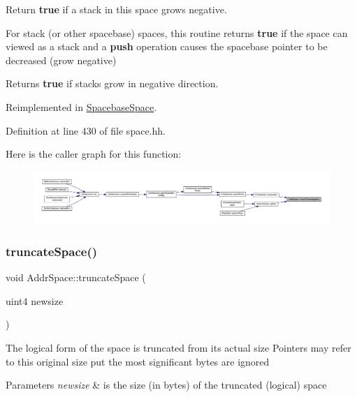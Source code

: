 Return {\bfseries{true}} if a stack in this space grows negative. 

For stack (or other spacebase) spaces, this routine returns {\bfseries{true}} if the space can viewed as a stack and a {\bfseries{push}} operation causes the spacebase pointer to be decreased (grow negative) \begin{DoxyReturn}{Returns}
{\bfseries{true}} if stacks grow in negative direction. 
\end{DoxyReturn}


Reimplemented in \mbox{\hyperlink{class_spacebase_space_abade76813d5936d68f715cfde95a764c}{Spacebase\+Space}}.



Definition at line 430 of file space.\+hh.

Here is the caller graph for this function\+:
\nopagebreak
\begin{figure}[H]
\begin{center}
\leavevmode
\includegraphics[width=350pt]{class_addr_space_a9468b2d0bc4cdaa762e213fb395ac434_icgraph}
\end{center}
\end{figure}
\mbox{\label{class_addr_space_a84ecacea771a34c4349d1f31272316c7}} 
\subsubsection{\texorpdfstring{truncateSpace()}{truncateSpace()}}
{\footnotesize\ttfamily void Addr\+Space\+::truncate\+Space (\begin{DoxyParamCaption}\item[{uint4}]{newsize }\end{DoxyParamCaption})\hspace{0.3cm}{\ttfamily [protected]}}

The logical form of the space is truncated from its actual size Pointers may refer to this original size put the most significant bytes are ignored 
\begin{DoxyParams}{Parameters}
{\em newsize} & is the size (in bytes) of the truncated (logical) space \\
\hline
\end{DoxyParams}


